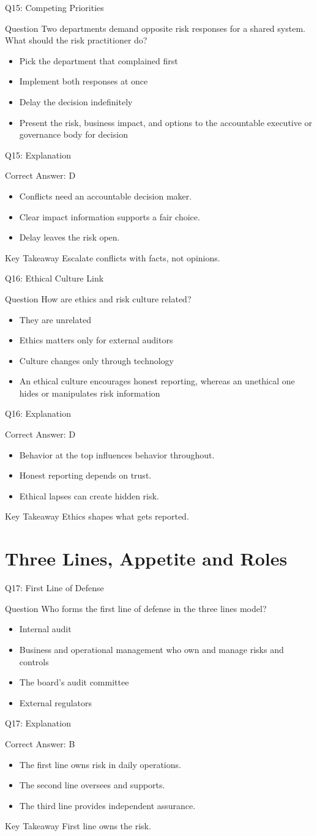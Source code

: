 \documentclass[aspectratio=169]{beamer}
\newcommand{\hq}[7]{%
	\begin{frame}{Q#1: #2}
		\begin{block}{Question}
			#3
		\end{block}
		\begin{itemize}
			#4
		\end{itemize}
	\end{frame}
	\begin{frame}{Q#1: Explanation}
		\begin{block}{Correct Answer: #5}
			\begin{itemize}
				#6
			\end{itemize}
		\end{block}
		\begin{alertblock}{Key Takeaway}
			#7
		\end{alertblock}
	\end{frame}
}
\begin{document}
	\hq{15}{Competing Priorities}
	{Two departments demand opposite risk responses for a shared system. What should the risk practitioner do?}
	{\item[\textbf{(A)}] Pick the department that complained first
		\item[\textbf{(B)}] Implement both responses at once
		\item[\textbf{(C)}] Delay the decision indefinitely
		\item[\textbf{(D)}] Present the risk, business impact, and options to the accountable executive or governance body for decision}
	{D}
	{\item Conflicts need an accountable decision maker.
		\item Clear impact information supports a fair choice.
		\item Delay leaves the risk open.}
	{Escalate conflicts with facts, not opinions.}
	
	\hq{16}{Ethical Culture Link}
	{How are ethics and risk culture related?}
	{\item[\textbf{(A)}] They are unrelated
		\item[\textbf{(B)}] Ethics matters only for external auditors
		\item[\textbf{(C)}] Culture changes only through technology
		\item[\textbf{(D)}] An ethical culture encourages honest reporting, whereas an unethical one hides or manipulates risk information}
	{D}
	{\item Behavior at the top influences behavior throughout.
		\item Honest reporting depends on trust.
		\item Ethical lapses can create hidden risk.}
	{Ethics shapes what gets reported.}
	
	\section{Three Lines, Appetite and Roles}
	
	\hq{17}{First Line of Defense}
	{Who forms the first line of defense in the three lines model?}
	{\item[\textbf{(A)}] Internal audit
		\item[\textbf{(B)}] Business and operational management who own and manage risks and controls
		\item[\textbf{(C)}] The board's audit committee
		\item[\textbf{(D)}] External regulators}
	{B}
	{\item The first line owns risk in daily operations.
		\item The second line oversees and supports.
		\item The third line provides independent assurance.}
	{First line owns the risk.}
	
\end{document}
